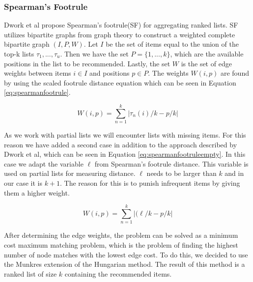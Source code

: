 \subsubsection{Spearman's Footrule}\label{sec:spearmansfootrule}
Dwork et al propose Spearman's footrule(SF) for aggregating ranked lists\citep{rank:aggregation}.
SF utilizes bipartite graphs from graph theory to construct a weighted complete bipartite graph $(I,P,W)$.
Let $I$ be the set of items equal to the union of the top-k lists $\tau_1, ..., \tau_u$. Then we have the set $P = \{1,...,k\}$, which are the available positions in the list to be recommended. Lastly, the set $W$ is the set of edge weights between items $i\in I$ and positions $p\in P$. The weights $W(i,p)$ are found by using the scaled footrule distance equation which can be seen in Equation \ref{eq:spearmanfootrule}\cite{rank:aggregation}.
 
\begin{equation}\label{eq:spearmanfootrule}
W(i,p) = \displaystyle\sum_{n=1}^{k} |\tau_n(i)/k - p/k|
\end{equation}

As we work with partial lists we will encounter lists with missing items. For this reason we have added a second case in addition to the approach described by Dwork et al, which can be seen in Equation \ref{eq:spearmanfootruleempty}. In this case we adapt the variable $\ell$ from Spearman's footrule distance. This variable is used on partial lists for measuring distance. $\ell$ needs to be larger than $k$ and in our case it is $k + 1$. The reason for this is to punish infrequent items by giving them a higher weight.

\begin{equation}\label{eq:spearmanfootruleempty}
W(i,p) = \displaystyle\sum_{n=1}^{k} |(\ell/k - p/k|
\end{equation}

After determining the edge weights, the problem can be solved as a minimum cost maximum matching problem, which is the problem of finding the highest number of node matches with the lowest edge cost. To do this, we decided to use the Munkres extension of the Hungarian method\cite{Munkres1957}. The result of this method is a ranked list of size $k$ containing the recommended items.